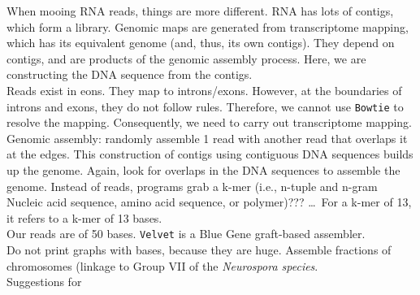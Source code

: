 When mooing RNA reads, things are more different. RNA has lots of contigs, which form a library. Genomic maps are generated from transcriptome mapping, which has its equivalent genome (and, thus, its own contigs). They depend on contigs, and are products of the genomic assembly process. Here, we are constructing the DNA sequence from the contigs. \\

Reads exist in eons. They map to introns/exons. However, at the boundaries of introns and exons, they do not follow rules. Therefore, we cannot use {\tt Bowtie} to resolve the mapping. Consequently, we need to carry out transcriptome mapping. Genomic assembly: randomly assemble 1 read with another read that overlaps it at the edges. This construction of contigs using contiguous DNA sequences builds up the genome. Again, look for overlaps in the DNA sequences to assemble the genome. Instead of reads, programs grab a k-mer (i.e., n-tuple and n-gram Nucleic acid sequence, amino acid sequence, or polymer)??? \dots\ For a k-mer of 13, it refers to a k-mer of 13 bases. \\

Our reads are of 50 bases. {\tt Velvet} is a Blue Gene graft-based assembler. \\

Do not print graphs with bases, because they are huge. Assemble fractions of chromosomes (linkage to Group VII of the {\it Neurospora species}. \\


Suggestions for 



























